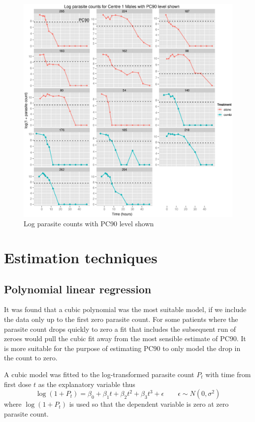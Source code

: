 \begin{figure}[p]
\begin{center}
\includegraphics[width=150mm]{log901M.eps}
\caption{Log parasite counts with PC90 level shown}
\label{log901M}
\end{center}
\end{figure}
\section{Estimation techniques}
\subsection{Polynomial linear regression}
It was found that a cubic polynomial was the most suitable model, if we include the data only up to the first zero parasite count. For some patients where the parasite count drops quickly to zero a fit that includes the subsequent run of zeroes would pull the cubic fit away from the most sensible estimate of PC90. It is more suitable for the purpose of estimating PC90 to only model the drop in the count to zero.

A cubic model was fitted to the log-transformed parasite count $P_{t}$ with time from first dose $t$ as the explanatory variable thus
$$\log(1+P_{t})=\beta_0+\beta_1t+\beta_2t^2+\beta_3t^3+\epsilon\quad\quad\epsilon\sim N(0,\sigma^2)$$
where $\log(1+P_{t})$ is used so that the dependent variable is zero at zero parasite count.

